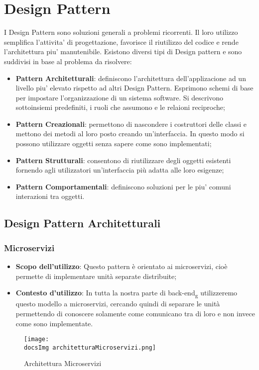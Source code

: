 \section{Design Pattern}
	I Design Pattern sono soluzioni generali a problemi ricorrenti. Il loro utilizzo semplifica l'attivita' di progettazione, favorisce il riutilizzo del codice e rende l'architettura piu' manutenibile. Esistono diversi tipi di Design pattern e sono suddivisi in base al problema da risolvere:
	\begin{itemize}\itemsep1pt
		\item \textbf{Pattern Architetturali}: definiscono l'architettura dell'applizacione ad un livello piu' elevato rispetto ad altri Design Pattern. Esprimono schemi di base per impostare l'organizzazione di un sistema software. Si descrivono sottoinsiemi predefiniti, i ruoli che assumono e le relaioni reciproche; 
		\item \textbf{Pattern Creazionali}: permettono di nascondere i costruttori delle classi e mettono dei metodi al loro posto creando un'interfaccia. In questo modo si possono utilizzare oggetti senza sapere come sono implementati;
		\item \textbf{Pattern Strutturali}: consentono di riutilizzare degli oggetti esistenti fornendo agli utilizzatori un'interfaccia più adatta alle loro esigenze;
		\item \textbf{Pattern Comportamentali}: definiscono soluzioni per le piu' comuni interazioni tra oggetti.
	\end{itemize} 
	
	\subsection{Design Pattern Architetturali}
		\subsubsection{Microservizi}
			\begin{itemize}
				\item\textbf{Scopo dell'utilizzo}: Questo pattern è orientato ai microservizi, cioè permette di implementare unità separate distribuite;
				\item\textbf{Contesto d'utilizzo}: In tutta la nostra parte di back-end\textsubscript{g} utilizzeremo questo modello a microservizi, cercando quindi di separare le unità permettendo di conoscere solamente come comunicano tra di loro e non invece come sono implementate.
			\end{itemize}
			\begin{figure}
				\centering
				\texttt{[image: \\docsImg architetturaMicroservizi.png]}
				\caption{Architettura Microservizi}
				\label{Fig. Architettura a microservizi}
			\end{figure}

